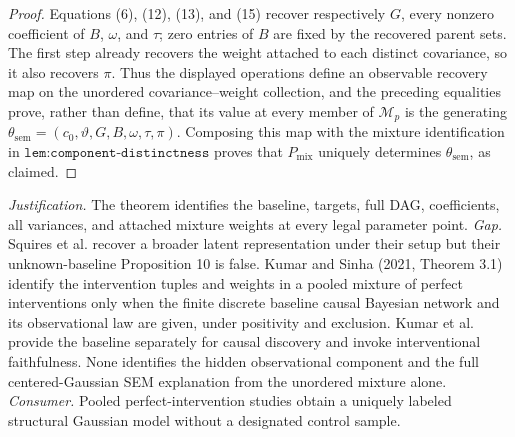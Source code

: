 \documentclass{article}
\begin{document}
\begin{proof}
Equations (6), (12), (13), and (15) recover respectively \(G\), every
nonzero coefficient of \(B\), \(\omega\), and \(\tau\); zero entries of
\(B\) are fixed by the recovered parent sets.  The first step already
recovers the weight attached to each distinct covariance, so it also recovers
\(\pi\).  Thus the displayed operations define an observable recovery map on
the unordered covariance--weight collection, and the preceding equalities
prove, rather than define, that its value at every member of \(\mathcal M_p\)
is the generating
\(\theta_{\mathrm{sem}}=(c_0,\vartheta,G,B,\omega,\tau,\pi)\).  Composing
this map with the mixture identification in
\(\texttt{lem:component-distinctness}\) proves that \(P_{\mathrm{mix}}\)
uniquely determines \(\theta_{\mathrm{sem}}\), as claimed.
\end{proof}
\par\smallskip\noindent \textit{Justification.} The theorem identifies the baseline, targets, full DAG, coefficients, all variances, and attached mixture weights at every legal parameter point. \textit{Gap.} Squires et al. recover a broader latent representation under their setup but their unknown-baseline Proposition 10 is false. Kumar and Sinha (2021, Theorem 3.1) identify the intervention tuples and weights in a pooled mixture of perfect interventions only when the finite discrete baseline causal Bayesian network and its observational law are given, under positivity and exclusion. Kumar et al. provide the baseline separately for causal discovery and invoke interventional faithfulness. None identifies the hidden observational component and the full centered-Gaussian SEM explanation from the unordered mixture alone. \textit{Consumer.} Pooled perfect-intervention studies obtain a uniquely labeled structural Gaussian model without a designated control sample.
\end{document}
